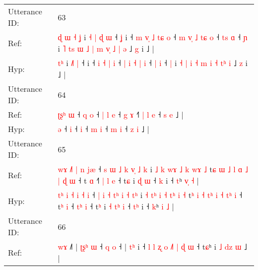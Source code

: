 \documentclass[10pt]{article}
\DeclareRobustCommand{\hl}[1]{{\textcolor{red}{#1}}}
\begin{document}
\begin{longtable}{ll}
 \\
\midrule
Utterance ID: & 63 \\
Ref: & \hl{ɖ}\hl{ }\hl{ɯ}\hl{ }\hl{˧}\hl{ }\hl{ʝ} i\hl{ }\hl{˧} \hl{|}\hl{ }\hl{ɖ} \hl{ɯ} ˧\hl{ }\hl{ʝ} i ˧\hl{ }\hl{m} \hl{v}\hl{̩} \hl{˩} \hl{t}\hl{ɕ} \hl{o} ˧ \hl{m} \hl{v}\hl{̩} \hl{˩} \hl{t}\hl{ɕ} \hl{o} ˧ \hl{t}\hl{s} \hl{ɑ} ˧ \hl{ɲ} i \hl{˥} \hl{t}\hl{s} \hl{ɯ} \hl{˩} \hl{|} \hl{m} \hl{v}\hl{̩} \hl{˩}\hl{ }\hl{|} \hl{ə} ˩ \hl{g} i ˩ |
 \\
Hyp: & \hl{}\hl{}\hl{}\hl{}\hl{}\hl{t}\hl{ʰ} i\hl{}\hl{} \hl{}\hl{˩}\hl{˥} \hl{|} ˧\hl{}\hl{} i ˧\hl{}\hl{} \hl{}\hl{i} \hl{˧} \hl{}\hl{|} \hl{i} ˧ \hl{|} \hl{}\hl{i} \hl{˧} \hl{}\hl{|} \hl{i} ˧ \hl{}\hl{|} \hl{i} ˧ \hl{|} i \hl{˧} \hl{}\hl{|} \hl{i} \hl{˧} \hl{m} \hl{i} \hl{}\hl{˧} \hl{}\hl{t}\hl{ʰ} \hl{i} ˩ \hl{z} i ˩ |
 \\
\midrule
Utterance ID: & 64 \\
Ref: & \hl{ʈ}\hl{ʂ}\hl{ʰ}\hl{ }\hl{ɯ} ˧\hl{ }\hl{q} \hl{o} ˧\hl{ }\hl{|}\hl{ }\hl{l} \hl{e} ˧ \hl{g} \hl{ɤ} ˧\hl{˥}\hl{ }\hl{|} \hl{l} \hl{e} ˧ \hl{s} \hl{e} ˩ |
 \\
Hyp: & \hl{}\hl{}\hl{}\hl{}\hl{ə} ˧\hl{}\hl{} \hl{i} ˧\hl{}\hl{}\hl{}\hl{} \hl{i} ˧ \hl{m} \hl{i} ˧\hl{}\hl{}\hl{} \hl{m} \hl{i} ˧ \hl{z} \hl{i} ˩ |
 \\
\midrule
Utterance ID: & 65 \\
Ref: & \hl{w}\hl{ɤ} \hl{˩}\hl{˥} \hl{|} \hl{n} \hl{}\hl{j}\hl{æ} ˧ \hl{s} \hl{ɯ} \hl{˩} \hl{k}\hl{ }\hl{v}\hl{̩} \hl{˩} \hl{}\hl{k} i \hl{˩} \hl{k}\hl{ }\hl{w}\hl{ɤ} \hl{˩} \hl{k}\hl{ }\hl{w}\hl{ɤ} \hl{˩} t\hl{ɕ} \hl{ɯ} \hl{˩} \hl{}\hl{l} \hl{ɑ} \hl{˩} \hl{|}\hl{ }\hl{ɖ} \hl{ɯ} ˧ t\hl{} \hl{ɑ} ˧\hl{˥} \hl{|}\hl{ }\hl{l} \hl{e} ˧ t\hl{ɕ} i\hl{}\hl{} \hl{}\hl{ɖ} \hl{ɯ} ˧ \hl{}\hl{k} i ˧ \hl{t}ʰ \hl{v}\hl{̩} \hl{˧} |
 \\
Hyp: & \hl{t}\hl{ʰ} \hl{}\hl{i} \hl{˧} \hl{i} \hl{˧}\hl{ }\hl{i} ˧ \hl{|} \hl{i} \hl{˧} \hl{t}\hl{ʰ}\hl{ }\hl{i} \hl{˧} \hl{t}\hl{ʰ} i \hl{˧} \hl{t}\hl{ʰ}\hl{ }\hl{i} \hl{˧} \hl{t}\hl{ʰ}\hl{ }\hl{i} \hl{˧} t\hl{ʰ} \hl{i} \hl{˧} \hl{t}\hl{ʰ} \hl{i} \hl{˧} \hl{}\hl{t}\hl{ʰ} \hl{i} ˧ t\hl{ʰ} \hl{i} ˧\hl{} \hl{}\hl{t}\hl{ʰ} \hl{i} ˧ t\hl{ʰ} i\hl{ }\hl{˧} \hl{t}\hl{ʰ} \hl{i} ˧ \hl{t}\hl{ʰ} i ˧ \hl{k}ʰ \hl{}\hl{i} \hl{˩} |
 \\
\midrule
Utterance ID: & 66 \\
Ref: & \hl{}\hl{}\hl{w}\hl{ɤ} ˩˥ | \hl{ʈ}\hl{ʂ}\hl{ʰ} \hl{ɯ} ˧ \hl{q} \hl{o} ˧ |\hl{ }\hl{t}\hl{ʰ} i ˧ \hl{l} \hl{l} \hl{ʐ} \hl{o} \hl{˩}\hl{˥} \hl{|} \hl{}\hl{ɖ} \hl{ɯ} ˧ t\hl{ɕ}ʰ i \hl{˩} \hl{d}\hl{z} \hl{ɯ} ˩ |

\end{longtable}
\end{document}
